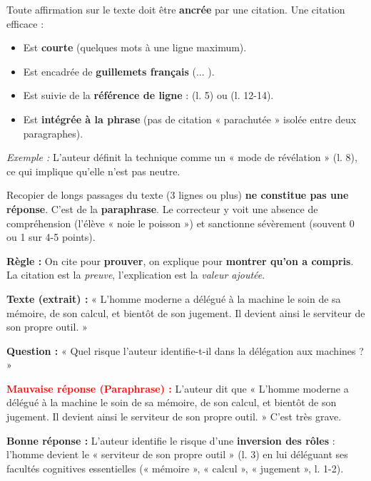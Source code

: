 \documentclass[11pt]{article}
\begin{document}
\begin{propriete}
Toute affirmation sur le texte doit être \textbf{ancrée} par une citation. Une citation efficace :
\begin{itemize}
    \item Est \textbf{courte} (quelques mots à une ligne maximum).
    \item Est encadrée de \textbf{guillemets français} (\og ... \fg{}).
    \item Est suivie de la \textbf{référence de ligne} : (l. 5) ou (l. 12-14).
    \item Est \textbf{intégrée à la phrase} (pas de citation « parachutée » isolée entre deux paragraphes).
\end{itemize}
\emph{Exemple :} L'auteur définit la technique comme un « mode de révélation » (l. 8), ce qui implique qu'elle n'est pas neutre.
\end{propriete}

\begin{attention}
Recopier de longs passages du texte (3 lignes ou plus) \textbf{ne constitue pas une réponse}. C'est de la \textbf{paraphrase}. Le correcteur y voit une absence de compréhension (l'élève « noie le poisson ») et sanctionne sévèrement (souvent 0 ou 1 sur 4-5 points).
\par\medskip
\textbf{Règle :} On cite pour \textbf{prouver}, on explique pour \textbf{montrer qu'on a compris}. La citation est la \emph{preuve}, l'explication est la \emph{valeur ajoutée}.
\end{attention}

\begin{exemplebox}
\textbf{Texte (extrait) :} « L'homme moderne a délégué à la machine le soin de sa mémoire, de son calcul, et bientôt de son jugement. Il devient ainsi le serviteur de son propre outil. »
\par\medskip
\textbf{Question :} « Quel risque l'auteur identifie-t-il dans la délégation aux machines ? »
\par\medskip
\textbf{\textcolor{red}{Mauvaise réponse (Paraphrase) :}} L'auteur dit que « L'homme moderne a délégué à la machine le soin de sa mémoire, de son calcul, et bientôt de son jugement. Il devient ainsi le serviteur de son propre outil. » C'est très grave.
\par\medskip
\textbf{\textcolor{popgreen}{Bonne réponse :}} L'auteur identifie le risque d'une \textbf{inversion des rôles} : l'homme devient le « serviteur de son propre outil » (l. 3) en lui déléguant ses facultés cognitives essentielles (« mémoire », « calcul », « jugement », l. 1-2).
\end{exemplebox}
\end{document}
